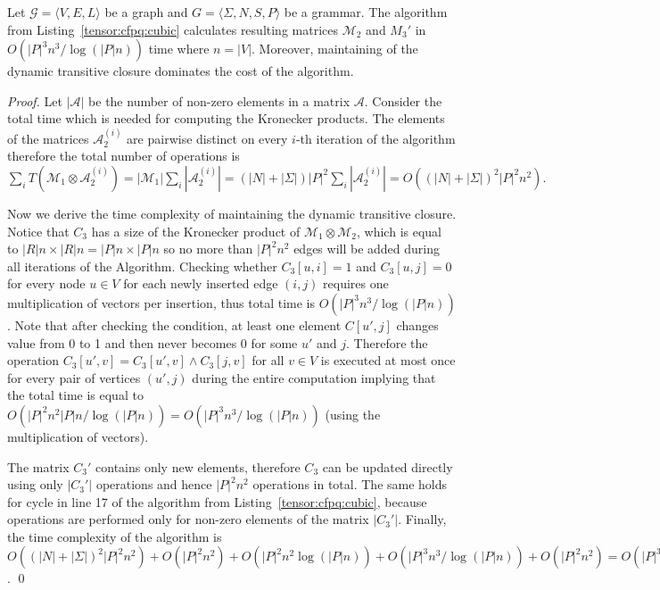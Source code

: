 \begin{theorem}{}
\label{theorem: subcubic}
    Let $\mathcal{G} = \langle V,E,L \rangle$ be a graph and $G = \langle\Sigma, N, S, P\rangle$ be a grammar.
    The algorithm from Listing~\ref{tensor:cfpq:cubic} calculates resulting matrices $\mathcal{M}_2$ and $M_3'$ in $O({|P|}^3n^3/\log (|P|n))$ time where $n = |V|$. Moreover, maintaining of the dynamic transitive closure dominates the cost of the algorithm.
\end{theorem}

\begin{proof}
 Let $|\mathcal{A}|$ be the number of non-zero elements in a matrix $\mathcal{A}$. Consider the total time which is needed for computing the Kronecker products. The elements of the matrices $\mathcal{A}_2^{(i)}$ are pairwise distinct on every $i$-th iteration of the algorithm therefore the total number of operations is $\sum\limits_i{T(\mathcal{M}_1 \otimes \mathcal{A}_2^{(i)})} = |\mathcal{M}_1| \sum\limits_i {|\mathcal{A}_2^{(i)}|} = (|N| + |\Sigma|){|P|}^2 \sum\limits_i {|\mathcal{A}_2^{(i)}|} = O({(|N| + |\Sigma|)}^2{|P|}^2 n^2).$


Now we derive the time complexity of maintaining the dynamic transitive closure.
Notice that $C_3$ has a size of the Kronecker product of $\mathcal{M}_1 \otimes \mathcal{M}_2$, which is equal to $|R|n \times |R|n = |P|n \times |P|n$ so no more than ${|P|}^2n^2$ edges will be added during all iterations of the Algorithm.
Checking whether $C_3[u, i] = 1$ and $C_3[u, j]=0$ for every node $u \in V$ for each newly inserted edge $(i, j)$ requires one multiplication of vectors per insertion, thus total time is $O({|P|}^3n^3/\log (|P|n))$.
Note that after checking the condition, at least one element $C[u', j]$ changes value from 0 to 1 and then never becomes 0 for some $u'$ and $j$.
Therefore the operation $C_3[u',v] = C_3[u', v] \wedge C_3[j, v]$ for all $v \in V$ is executed at most once for every pair of vertices $(u',j)$ during the entire computation implying that the total time is equal to $O({|P|}^2n^2|P|n/\log (|P|n))=O({|P|}^3n^3/\log (|P|n))$ (using the  multiplication of vectors).


The matrix $C_3'$ contains only new elements, therefore $C_3$ can be updated directly using only $|C_3'|$ operations and hence ${|P|}^2n^2$ operations in total.
The same holds for cycle in line 17 of the algorithm from Listing~\ref{tensor:cfpq:cubic}, because operations are performed only for non-zero elements of the matrix $|C_3'|$.
Finally, the time complexity of the algorithm is $O({(|N| + |\Sigma|)}^2{|P|}^2 n^2) + O({|P|}^2n^2) + O({|P|}^2n^2 \log (|P|n)) + O({|P|}^3n^3/\log (|P|n)) + O({|P|}^2n^2)= O({|P|}^3n^3/\log (|P|n))$. \qed
\end{proof}

